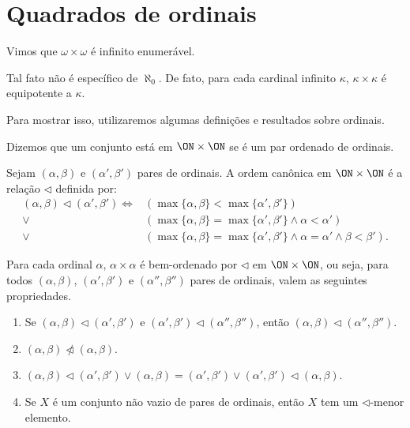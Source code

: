 \section{Quadrados de ordinais}\label{sec:quadradosDeOrdinais}
Vimos que $\omega\times \omega$ é infinito enumerável.

Tal fato não é específico de $\aleph_0$.
De fato, para cada cardinal infinito $\kappa$, $\kappa\times \kappa$ é equipotente a $\kappa$.

Para mostrar isso, utilizaremos algumas definições e resultados sobre ordinais.

\begin{definition}\label{def:ordemCanonicaEmOnQuadrado}
    Dizemos que um conjunto está em $\ON\times \ON$ se é um par ordenado de ordinais.

    Sejam $(\alpha, \beta)$ e $(\alpha', \beta')$ pares de ordinais.
    A ordem canônica em $\ON\times \ON$ é a relação $\triangleleft$ definida por:
    \begin{align*}
    (\alpha, \beta) \triangleleft (\alpha', \beta') \Longleftrightarrow &(\max\{\alpha, \beta\} < \max\{\alpha', \beta'\}) \\
    \lor &(\max\{\alpha, \beta\} = \max\{\alpha', \beta'\} \land \alpha < \alpha') \\
    \lor &(\max\{\alpha, \beta\} = \max\{\alpha', \beta'\} \land \alpha = \alpha' \land \beta < \beta').
    \end{align*}
\end{definition}
\begin{lemma}\label{lem:boaOrdemCanonicaNoQuadradoDeOrdinal}
    Para cada ordinal $\alpha$, $\alpha\times \alpha$ é bem-ordenado por $\triangleleft$ em $\ON\times \ON$, ou seja, para todos $(\alpha, \beta)$, $(\alpha', \beta')$ e $(\alpha'', \beta'')$ pares de ordinais, valem as seguintes propriedades.
    \begin{enumerate}[label=(\alph*)]
        \item Se $(\alpha, \beta) \triangleleft (\alpha', \beta')$ e $(\alpha', \beta') \triangleleft (\alpha'', \beta'')$, então $(\alpha, \beta) \triangleleft (\alpha'', \beta'')$.
        \item $(\alpha, \beta) \ntriangleleft (\alpha, \beta)$.
        \item $(\alpha, \beta) \triangleleft (\alpha', \beta') \lor (\alpha, \beta) = (\alpha', \beta') \lor (\alpha', \beta') \triangleleft (\alpha, \beta)$.
        \item Se $X$ é um conjunto não vazio de pares de ordinais, então $X$ tem um $\triangleleft$-menor elemento.
    \end{enumerate}
\end{lemma}

